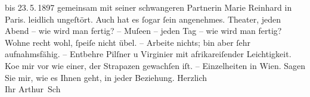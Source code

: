 \begin{ledgroupsized}[t]{13cm}
{{{                  bis 23. 5. 1897
                  gemeinsam mit seiner schwangeren Partnerin Marie Reinhard in Paris.}}}\label{K_L02963-1h} leidlich {\pb}ungeſtört. Auch hat es ſogar ſein angenehmes.
               Theater, jeden Abend – wie wird man fertig? – Muſeen – jeden Tag – wie wird man
               fertig? Wohne recht wohl, ſpeiſe nicht übel. – Arbeite nichts; bin aber ſehr
               aufnahmsfähig. – {\pb}Entbehre Pilſner u
               Virginier mit afrikareiſender Leichtigkeit.
                  Ko{\geminationm}e mir vor wie einer, der Strapazen gewachſen iſt.
               –\pend
           \pstart
           Einzelheiten in Wien.\pend
           \pstart
           Sagen Sie mir, wie es Ihnen geht, in jeder Beziehung. Herzlich {\\}Ihr
                  \spacefill\mbox{Arthur Sch}\pend
           
         
         \endnumbering{}\end{ledgroupsized}  \newcommand{\dateiname}{L02963}\newcommand{\titel}{Arthur Schnitzler an Felix Salten, 26. 4. 1897}\newcommand{\editorInnen}{Martin Anton Müller und Laura Untner}
      